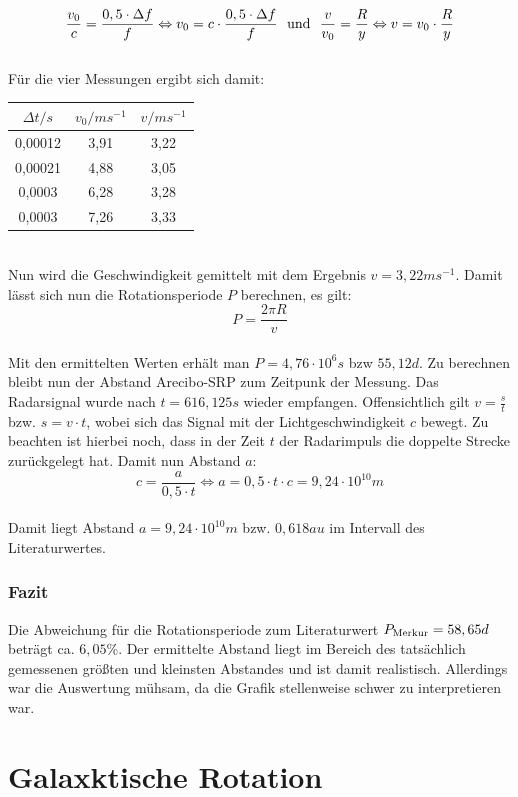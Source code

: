 \documentclass[12pt]{article}
\begin{document}
\[\frac{v_0}{c} = \frac{0,5 \cdot \Delta f}{f} \Leftrightarrow v_0 = c \cdot \frac{0,5 \cdot \Delta f}{f} \ \ \textnormal{und} \ \ \frac{v}{v_0} = \frac{R}{y} \Leftrightarrow v = v_0 \cdot \frac{R}{y}\]\\
Für die vier Messungen ergibt sich damit:
\begin{table}[!ht]
    \centering
    \begin{tabular}{c|c|c}
        $\Delta t / s$ & $v_0 / ms^{-1}$ & $v / ms^{-1}$ \\ \hline
        0,00012 & 3,91 & 3,22 \\
        0,00021 & 4,88 & 3,05 \\ 
        0,0003 & 6,28 & 3,28 \\ 
        0,0003 & 7,26 & 3,33 \\ 
    \end{tabular}
\end{table}\\
Nun wird die Geschwindigkeit gemittelt mit dem Ergebnis $v = 3,22 ms^{-1}$.
\newpage\noindent
Damit lässt sich nun die Rotationsperiode $P$ berechnen, es gilt:
\[P = \frac{2\pi R}{v}\]\\
Mit den ermittelten Werten erhält man $P = 4,76 \cdot 10^6s$ bzw $55,12d$. Zu berechnen bleibt nun der Abstand Arecibo-SRP zum Zeitpunk der Messung. Das Radarsignal wurde nach $t= 616,125s$ wieder empfangen. Offensichtlich gilt $v=\frac{s}{t}$ bzw. $s= v \cdot t$, wobei sich das Signal mit der Lichtgeschwindigkeit $c$ bewegt. Zu beachten ist hierbei noch, dass in der Zeit $t$ der Radarimpuls die doppelte Strecke zurückgelegt hat. Damit nun Abstand $a$:
\[c = \frac{a}{0,5 \cdot t} \Leftrightarrow a = 0,5 \cdot t \cdot c = 9,24\cdot 10^{10}m\]\\
Damit liegt Abstand $a = 9,24 \cdot 10^{10}m$ bzw. $0,618au$ im Intervall des Literaturwertes.\\
\subsubsection*{Fazit}
Die Abweichung für die Rotationsperiode zum Literaturwert $P_{\textnormal{Merkur}} = 58,65d$ beträgt ca. $6,05\%$. Der ermittelte Abstand liegt im Bereich des tatsächlich gemessenen größten und kleinsten Abstandes und ist damit realistisch. Allerdings war die Auswertung mühsam, da die Grafik stellenweise schwer zu interpretieren war.
\section{Galaxktische Rotation}
\end{document}
